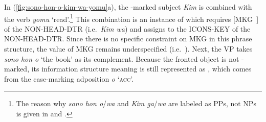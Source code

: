 \noindent In (\ref{fig:sono-hon-o-kim-wa-yomu}a), the \wa-marked
subject \textit{Kim} is combined with the verb \textit{yomu}
`read'.\footnote{The reason why \textit{sono hon o}/\textit{wa} and
  \textit{Kim ga}/\textit{wa} are labeled as PPs, not NPs is given in
  \citet{yatabe:99} and \citet{siegel:99}.} This combination is an
instance of  which requires \mbox{[MKG
    ]} of the NON-HEAD-DTR (i.e.\ \textit{Kim wa}) and assigns
 to the ICONS-KEY of the NON-HEAD-DTR. Since there
is no specific constraint on MKG in this phrase structure, the value
of MKG remains underspecified
(i.e.\ ). Next, the VP takes
\textit{sono hon o} `the book' as its complement. Because the fronted
object is not \wa-marked, its information structure meaning is still
represented as , which comes from the case-marking
adposition \textit{o} `\textsc{acc}'.



